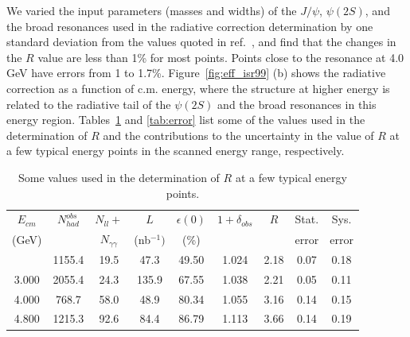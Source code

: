 We varied the input parameters (masses and widths) of the  
$J/\psi$, $\psi(2S)$, and the broad resonances used in the radiative
correction determination
by one standard 
deviation from the values quoted in ref.~\cite{PDG2k}, and find 
that the changes
in the $R$ value are less than 1\% for most points.
Points close to 
the resonance at 4.0 GeV have errors from 1 to 1.7\%. 
Figure~\ref{fig:eff_isr99} (b) shows the radiative correction as a 
function of c.m. energy, where the structure at higher energy is 
related to the 
radiative tail of the $\psi(2S)$ and the broad resonances in this 
energy region.   
Tables~\ref{tab:value} and \ref{tab:error}
list some of the values used in the determination of $R$ and the
contributions to the uncertainty in the value of $R$ at a few
typical energy points in the scanned energy range, respectively.

\begin{table}[!htbp]
\caption{Some values used in the determination of $R$ at a few
typical energy points.}
\begin{tabular}{ccccccccc}
$E_{cm}$ & $N_{had}^{obs}$ & $N_{ll}+$ & $L$  &
$\epsilon(0)$ & $1+\delta_{obs}$ & $R$  & Stat.  & Sys.  \\
(GeV)  & & $N_{\gamma\gamma}$ & (nb$^{-1})$ & (\%) & &  & error & error \\
\tableline
2.000 & 1155.4 & 19.5 &  47.3 & 49.50 & 1.024 & 2.18 & 0.07 & 0.18 \\
3.000 & 2055.4 & 24.3 & 135.9 & 67.55 & 1.038 & 2.21 & 0.05 & 0.11 \\
4.000 &  768.7 & 58.0 &  48.9 & 80.34 & 1.055 & 3.16 & 0.14 & 0.15 \\
4.800 & 1215.3 & 92.6 &  84.4 & 86.79 & 1.113 & 3.66 & 0.14 & 0.19 \\
\end{tabular}
\label{tab:value}
\end{table}

